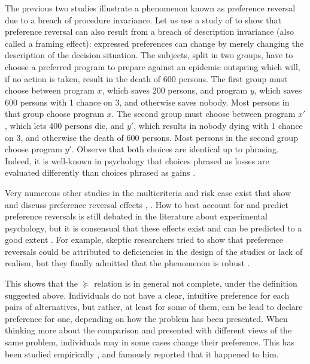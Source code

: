 \documentclass[french, english]{llncs}
\begin{document}
	The previous two studies illustrate a phenomenon known as preference reversal due to a breach of procedure invariance. Let us use a study of \citet{tversky_framing_1981} to show that preference reversal can also result from a breach of description invariance (also called a framing effect): expressed preferences can change by merely changing the description of the decision situation. The subjects, split in two groups, have to choose a preferred program to prepare against an epidemic outspring which will, if no action is taken, result in the death of 600 persons. The first group must choose between program $x$, which saves 200 persons, and program $y$, which saves 600 persons with 1 chance on 3, and otherwise saves nobody. Most persons in that group choose program $x$. The second group must choose between program $x'$, which lets 400 persons die, and $y'$, which results in nobody dying with 1 chance on 3, and otherwise the death of 600 persons. Most persons in the second group choose program $y'$. Observe that both choices are identical up to phrasing. Indeed, it is well-known in psychology that choices phrased as losses are evaluated differently than choices phrased as gains \citet{thaler_toward_1980}.
	
	Very numerous other studies in the multicriteria and risk case exist that show and discuss preference reversal effects \citep[Ch. 2]{deparis_etude_2012}, \citep{lichtenstein_construction_2006, tversky_framing_1981, tversky_causes_1990, kahneman_judgement_1981, kahneman_choices_2000}. How to best account for and predict preference reversals is still debated in the literature about experimental psychology, but it is consensual that these effects exist and can be predicted to a good extent \citep{wakker_prospect_2010, birnbaum_empirical_2017}. For example, skeptic researchers tried to show that preference reversals could be attributed to deficiencies in the design of the studies or lack of realism, but they finally admitted that the phenomenon is robust \citet{slovic_preference_1983}.
		
	This shows that the $\succeq$ relation is in general not complete, under the definition suggested above. Individuals do not have a clear, intuitive preference for each pairs of alternatives, but rather, at least for some of them, can be lead to declare preference for one, depending on how the problem has been presented. When thinking more about the comparison and presented with different views of the same problem, individuals may in some cases change their preference. This has been studied empirically \citep{slovic_who_1974, maccrimmon_utility_1979, lichtenstein_reversals_2006}, and \citet[pp. 101 – 103]{savage_foundations_1972} famously reported that it happened to him. 
\end{document}
